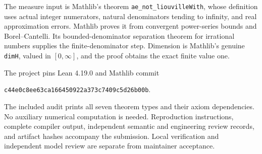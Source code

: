 \documentclass[10pt]{article}
\begin{document}
The measure input is Mathlib's theorem \texttt{ae\_not\_liouvilleWith}, whose definition uses actual integer numerators, natural denominators tending to infinity, and real approximation errors. Mathlib proves it from convergent power-series bounds and Borel--Cantelli. Its bounded-denominator separation theorem for irrational numbers supplies the finite-denominator step. Dimension is Mathlib's genuine \texttt{dimH}, valued in $[0,\infty]$, and the proof obtains the exact finite value one.

The project pins Lean 4.19.0 and Mathlib commit
\begin{center}\small\texttt{c44e0c8ee63ca166450922a373c7409c5d26b00b}.\end{center}
The included audit prints all seven theorem types and their axiom dependencies. No auxiliary numerical computation is needed. Reproduction instructions, complete compiler output, independent semantic and engineering review records, and artifact hashes accompany the submission. Local verification and independent model review are separate from maintainer acceptance.
\end{document}
